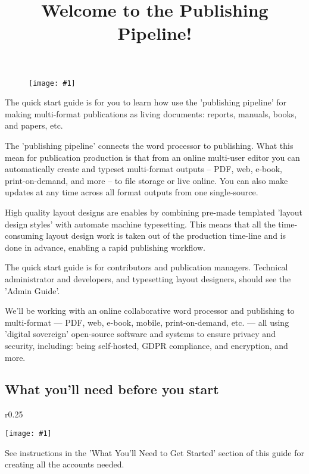 \documentclass{article}
\newlength{\imgwidth}
\newcommand\scaledgraphics[2]{%
                
\settowidth{\imgwidth}{\texttt{[image: \#1]}}%
                
\setlength{\imgwidth}{\minof{\imgwidth}{#2\textwidth}}%
                
\texttt{[image: \#1]}%
                
}
\begin{document}
\title{Welcome to the Publishing Pipeline!}

\maketitle

\begin{figure}
\scaledgraphics{b3bc6ba5-db38-4ec8-89db-45c029fdb485.png}{0.75}
\label{F98934631}
\end{figure}


The quick start guide is for you to learn how use the 'publishing pipeline' for making multi-format publications as living documents: reports, manuals, books, and papers, etc.


The 'publishing pipeline' connects the word processor to publishing. What this mean for publication production is that from an online multi-user editor you can automatically create and typeset multi-format outputs – PDF, web, e-book, print-on-demand, and more – to file storage or live online. You can also make updates at any time across all format outputs from one single-source. 


High quality layout designs are enables by combining pre-made templated 'layout design styles' with automate machine typesetting. This means that all the time-consuming layout design work is taken out of the production time-line and is done in advance, enabling a rapid publishing workflow.


The quick start guide is for contributors and publication managers. Technical administrator and developers, and typesetting layout designers, should see the 'Admin Guide'.


We'll be working with an online collaborative word processor and publishing to multi-format — PDF, web, e-book, mobile, print-on-demand, etc. — all using 'digital sovereign' open-source software and systems to ensure privacy and security, including: being self-hosted, GDPR compliance, and encryption, and more.


\subsection{What you'll need before you start}\label{H4632171}


\begin{wrapfigure}{r}{0.25\textwidth}
\scaledgraphics{fec439eb-c4d6-4587-a4a2-affde7c45586.png}{0.25}
\label{F18710661}
\end{wrapfigure}


See instructions in the 'What You'll Need to Get Started' section of this guide for creating all the accounts needed.
\end{document}
